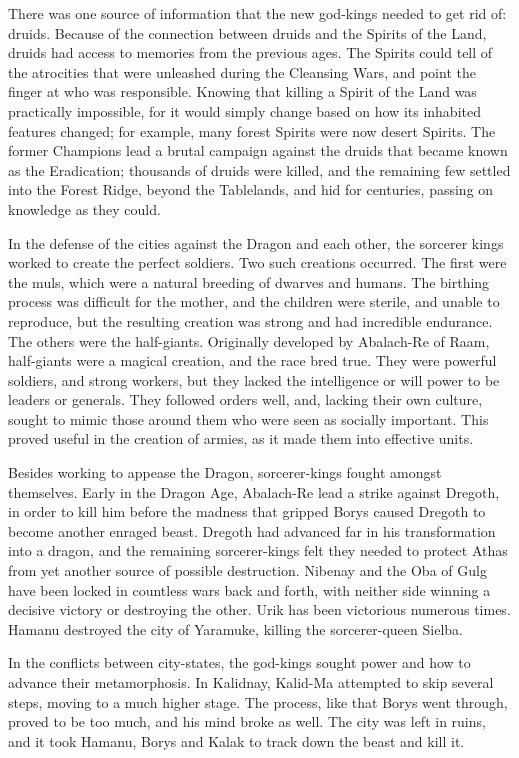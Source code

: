 There was one source of information that the new god-kings needed to get rid of: druids. Because of the connection between druids and the Spirits of the Land, druids had access to memories from the previous ages. The Spirits could tell of the atrocities that were unleashed during the Cleansing Wars, and point the finger at who was responsible. Knowing that killing a Spirit of the Land was practically impossible, for it would simply change based on how its inhabited features changed; for example, many forest Spirits were now desert Spirits. The former Champions lead a brutal campaign against the druids that became known as the Eradication; thousands of druids were killed, and the remaining few settled into the Forest Ridge, beyond the Tablelands, and hid for centuries, passing on knowledge as they could.

In the defense of the cities against the Dragon and each other, the sorcerer kings worked to create the perfect soldiers. Two such creations occurred. The first were the muls, which were a natural breeding of dwarves and humans. The birthing process was difficult for the mother, and the children were sterile, and unable to reproduce, but the resulting creation was strong and had incredible endurance. The others were the half-giants. Originally developed by Abalach-Re of Raam, half-giants were a magical creation, and the race bred true. They were powerful soldiers, and strong workers, but they lacked the intelligence or will power to be leaders or generals. They followed orders well, and, lacking their own culture, sought to mimic those around them who were seen as socially important. This proved useful in the creation of armies, as it made them into effective units.

Besides working to appease the Dragon, sorcerer-kings fought amongst themselves. Early in the Dragon Age, Abalach-Re lead a strike against Dregoth, in order to kill him before the madness that gripped Borys caused Dregoth to become another enraged beast. Dregoth had advanced far in his transformation into a dragon, and the remaining sorcerer-kings felt they needed to protect Athas from yet another source of possible destruction. Nibenay and the Oba of Gulg have been locked in countless wars back and forth, with neither side winning a decisive victory or destroying the other. Urik has been victorious numerous times. Hamanu destroyed the city of Yaramuke, killing the sorcerer-queen Sielba.

In the conflicts between city-states, the god-kings sought power and how to advance their metamorphosis. In Kalidnay, Kalid-Ma attempted to skip several steps, moving to a much higher stage. The process, like that Borys went through, proved to be too much, and his mind broke as well. The city was left in ruins, and it took Hamanu, Borys and Kalak to track down the beast and kill it.

